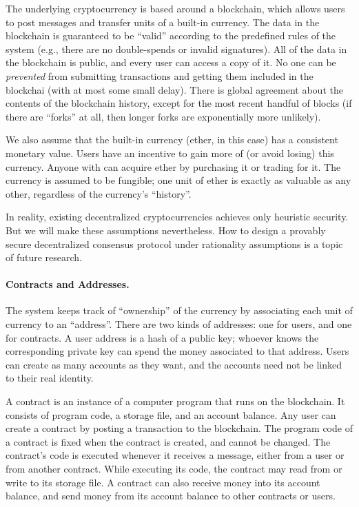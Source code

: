 \documentclass[12pt]{article}
\begin{document}
The underlying cryptocurrency is based around a blockchain,
which allows users to post messages and transfer units of a built-in currency.
The data in the blockchain is guaranteed to be ``valid'' according to the predefined rules of the system (e.g., there are no double-spends or invalid signatures).
All of the data in the blockchain is public, and every user can access a copy of it.
No one can be \emph{prevented} from submitting transactions and getting 
them included in the blockchai (with at most some small delay).
There is global agreement about the contents of the blockchain history, except for the most 
recent handful of blocks (if there are ``forks'' at all, then longer forks are exponentially more unlikely).

We also assume that the built-in currency (ether, in this case) has a consistent monetary value. Users have an incentive to gain more of (or avoid losing) this currency. Anyone with can acquire ether by purchasing it or trading for it. The currency is assumed to be fungible; one unit of ether is exactly as valuable as any other, regardless of the currency's ``history''.

In reality, existing decentralized cryptocurrencies
achieves only heuristic security. But we will make these assumptions
nevertheless. How to design a provably  
secure decentralized consensus protocol under
rationality assumptions is a topic of 
future research.

\paragraph{Contracts and Addresses.}
The system keeps track of ``ownership'' of the currency by associating each unit of currency to an ``address''. There are two kinds of addresses: one for users, and one for contracts. A user address is a hash of a public key; whoever knows the corresponding private key can spend the money associated to that address. Users can create as many accounts as they want, and the accounts need not be linked to their real identity.

A contract is an instance of a computer program that runs on the blockchain. It consists of program code, a storage file, and an account balance.
Any user can create a contract by posting a transaction to the blockchain.
The program code of a contract is fixed when the contract is created, and cannot be changed.
The contract's code is executed whenever it receives a message, either from a user or from another contract.
While executing its code, the contract may read from or write to its storage file.
A contract can also receive money into its account balance, and send money from its account balance to other contracts or users.
\end{document}
